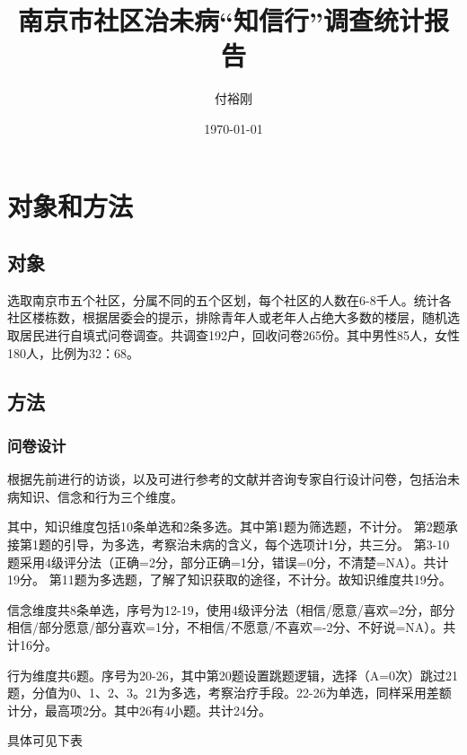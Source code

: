 \documentclass{article}
\title{南京市社区治未病“知信行”调查统计报告}
\author{付裕刚}
\date{\today}
\begin{document}
    \maketitle
\section{对象和方法}
\subsection{对象}
选取南京市五个社区，分属不同的五个区划，每个社区的人数在6-8千人。统计各社区楼栋数，根据居委会的提示，排除青年人或老年人占绝大多数的楼层，随机选取居民进行自填式问卷调查。共调查192户，回收问卷265份。其中男性85人，女性180人，比例为32：68。
\subsection{方法}
\subsubsection{问卷设计}
根据先前进行的访谈，以及可进行参考的文献\cite{cjw_1_2009}\cite{wcy2011}\cite{kam2005}并咨询专家自行设计问卷，包括治未病知识、信念和行为三个维度。

其中，知识维度包括10条单选和2条多选。其中第1题为筛选题，不计分。
第2题承接第1题的引导，为多选，考察治未病的含义，每个选项计1分，共三分。
第3-10题采用4级评分法（正确=2分，部分正确=1分，错误=0分，不清楚=NA）。共计19分。
第11题为多选题，了解了知识获取的途径，不计分。故知识维度共19分。

信念维度共8条单选，序号为12-19，使用4级评分法（相信/愿意/喜欢=2分，部分相信/部分愿意/部分喜欢=1分，不相信/不愿意/不喜欢=-2分、不好说=NA）。共计16分。

行为维度共6题。序号为20-26，其中第20题设置跳题逻辑，选择（A=0次）跳过21题，分值为0、1、2、3。21为多选，考察治疗手段。22-26为单选，同样采用差额计分，最高项2分。其中26有4小题。共计24分。

具体可见下表
\newpage
   
\end{document}
